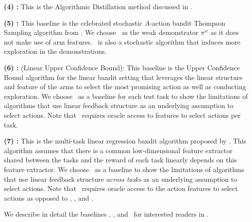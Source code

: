 \textbf{(4) \ad:} This is the Algorithmic Distillation method \citep{laskin2022context, lu2021low} discussed in . 

\textbf{(5) \ts:} This baseline is the celebrated stochastic $A$-action bandit Thompson Sampling algorithm from \citet{thompson1933likelihood,agrawal2012analysis,russo2018tutorial,zhu2020thompson}.
%
We choose \ts\ as the weak demonstrator $\pi^w$ as it does not make use of arm features.
% 
\ts\ is also a stochastic algorithm that induces more exploration in the demonstrations. 

\textbf{(6) \linucb:} (Linear Upper Confidence Bound): This baseline is the Upper Confidence Bound algorithm for the linear bandit setting that leverages the linear structure and feature of the arms to select the most promising action as well as conducting exploration. We choose \linucb\ as a baseline for each test task to show the limitations of algorithms that use linear feedback structure as an underlying assumption to select actions. Note that \linucb\ requires oracle access to features to select actions per task.


\textbf{(7) \mlin:} This is the multi-task linear regression bandit algorithm proposed by \citet{yang2021impact}. This algorithm assumes that there is a common low-dimensional feature extractor shared between the tasks and the reward of each task linearly depends on this feature extractor. We choose \mlin\ as a baseline to show the limitations of algorithms that use linear feedback structure \textit{across tasks} as an underlying assumption to select actions. Note that \mlin\ requires oracle access to the action features to select actions as opposed to \dpt, \ad, and \pred.

We describe in detail the baselines \ts, \linucb, and \mlin\ for interested readers in .


